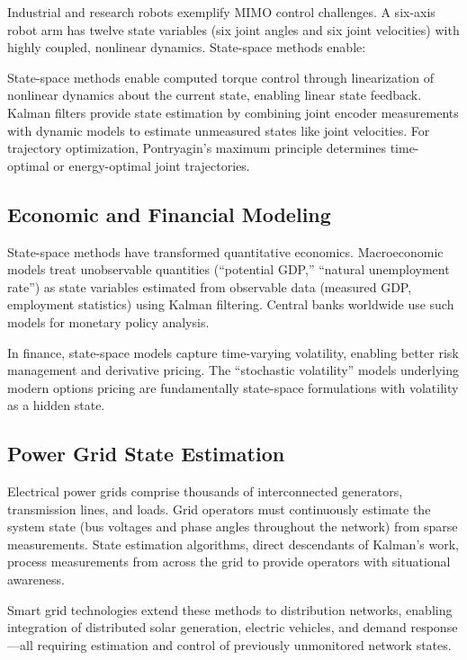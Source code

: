 Industrial and research robots exemplify MIMO control challenges. A six-axis robot arm has twelve state variables (six joint angles and six joint velocities) with highly coupled, nonlinear dynamics. State-space methods enable:

State-space methods enable computed torque control through linearization of nonlinear dynamics about the current state, enabling linear state feedback. Kalman filters provide state estimation by combining joint encoder measurements with dynamic models to estimate unmeasured states like joint velocities. For trajectory optimization, Pontryagin's maximum principle determines time-optimal or energy-optimal joint trajectories.

\subsection{Economic and Financial Modeling}

State-space methods have transformed quantitative economics. Macroeconomic models treat unobservable quantities (``potential GDP,'' ``natural unemployment rate'') as state variables estimated from observable data (measured GDP, employment statistics) using Kalman filtering. Central banks worldwide use such models for monetary policy analysis.

In finance, state-space models capture time-varying volatility, enabling better risk management and derivative pricing. The ``stochastic volatility'' models underlying modern options pricing are fundamentally state-space formulations with volatility as a hidden state.

\subsection{Power Grid State Estimation}

Electrical power grids comprise thousands of interconnected generators, transmission lines, and loads. Grid operators must continuously estimate the system state (bus voltages and phase angles throughout the network) from sparse measurements. State estimation algorithms, direct descendants of Kalman's work, process measurements from across the grid to provide operators with situational awareness.

Smart grid technologies extend these methods to distribution networks, enabling integration of distributed solar generation, electric vehicles, and demand response---all requiring estimation and control of previously unmonitored network states.

